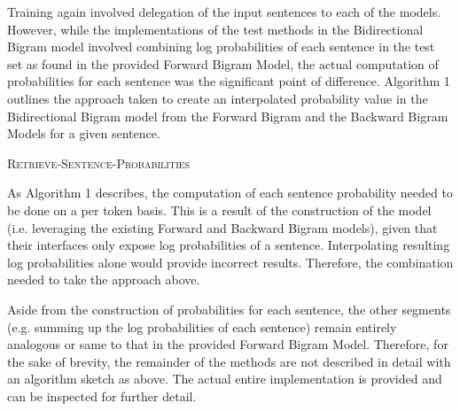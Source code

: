 \documentclass{article} %
\begin{document}
Training again involved delegation of the input sentences to each of the models. However, while the implementations of the test methods in the Bidirectional Bigram model involved combining log probabilities of each sentence in the test set as found in the provided Forward Bigram Model, the actual computation of probabilities for each sentence was the significant point of difference. Algorithm 1 outlines the approach taken to create an interpolated probability value in the Bidirectional Bigram model from the Forward Bigram and the Backward Bigram Models for a given sentence. 

\begin{algorithm}
  \caption{\textsc {Retrieve-Sentence-Probabilities} \label{IR2}}  
\end{algorithm}

As Algorithm 1 describes, the computation of each sentence probability needed to be done on a per token basis. This is a result of the construction of the model (i.e. leveraging the existing Forward and Backward Bigram models), given that their interfaces only expose log probabilities of a sentence. Interpolating resulting log probabilities alone would provide incorrect results. Therefore, the combination needed to take the approach above.

Aside from the construction of probabilities for each sentence, the other segments (e.g. summing up the log probabilities of each sentence) remain entirely analogous or same to that in the provided Forward Bigram Model. Therefore, for the sake of brevity, the remainder of the methods are not described in detail with an algorithm sketch as above. The actual entire implementation is provided and can be inspected for further detail. 
\end{document}

